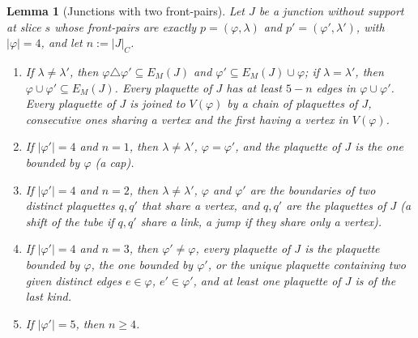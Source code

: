 \documentclass[11pt,a4paper]{article}
\newtheorem{lemma}[theorem]{Lemma}
\theoremstyle{definition}
\theoremstyle{remark}
\begin{document}
\begin{lemma}[Junctions with two front-pairs]\label{mg:lem:twofront}
Let $J$ be a junction without support at slice $s$ whose front-pairs are exactly $p=(\varphi,\lambda)$ and $p'=(\varphi',\lambda')$, with $|\varphi|=4$,
and let $n:=|J|_C$.
\begin{enumerate}[label=(\roman*)]
\item If $\lambda\ne\lambda'$, then $\varphi\triangle\varphi'\subseteq E_M(J)$ and $\varphi'\subseteq E_M(J)\cup\varphi$; if $\lambda=\lambda'$, then
$\varphi\cup\varphi'\subseteq E_M(J)$. Every plaquette of $J$ has at least $5-n$ edges in $\varphi\cup\varphi'$. Every plaquette of $J$ is joined to $V(\varphi)$
by a chain of plaquettes of $J$, consecutive ones sharing a vertex and the first having a vertex in $V(\varphi)$.
\item If $|\varphi'|=4$ and $n=1$, then $\lambda\ne\lambda'$, $\varphi=\varphi'$, and the plaquette of $J$ is the one bounded by $\varphi$ (a \emph{cap}).
\item If $|\varphi'|=4$ and $n=2$, then $\lambda\ne\lambda'$, $\varphi$ and $\varphi'$ are the boundaries of two distinct plaquettes $q,q'$ that share a vertex, and
$q,q'$ are the plaquettes of $J$ (a \emph{shift} of the tube if $q,q'$ share a link, a \emph{jump} if they share only a vertex).
\item If $|\varphi'|=4$ and $n=3$, then $\varphi'\neq\varphi$, every plaquette of $J$ is the plaquette bounded by $\varphi$, the one bounded by $\varphi'$, or the
unique plaquette containing two given distinct edges $e\in\varphi$, $e'\in\varphi'$, and at least one plaquette of $J$ is of the last kind.
\item If $|\varphi'|=5$, then $n\ge4$.
\end{enumerate}
\end{lemma}
\end{document}
